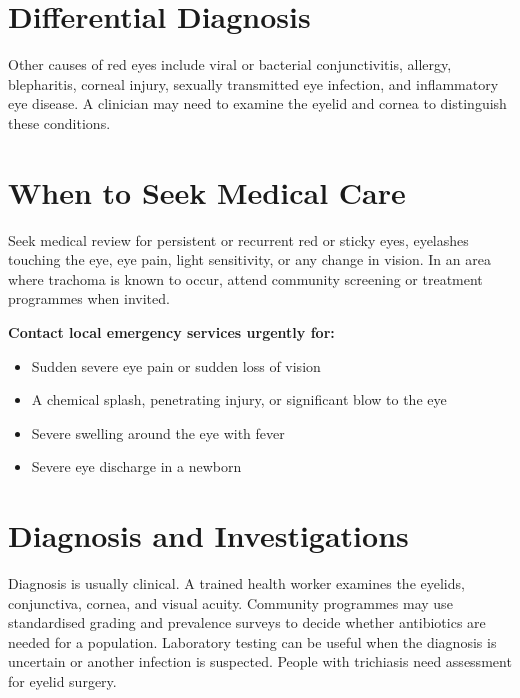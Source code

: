 \section*{Differential Diagnosis}
Other causes of red eyes include viral or bacterial conjunctivitis, allergy, blepharitis, corneal injury, sexually transmitted eye infection, and inflammatory eye disease. A clinician may need to examine the eyelid and cornea to distinguish these conditions.

\section*{When to Seek Medical Care}
Seek medical review for persistent or recurrent red or sticky eyes, eyelashes touching the eye, eye pain, light sensitivity, or any change in vision. In an area where trachoma is known to occur, attend community screening or treatment programmes when invited.

\textbf{Contact local emergency services urgently for:}
\begin{itemize}
    \item Sudden severe eye pain or sudden loss of vision
    \item A chemical splash, penetrating injury, or significant blow to the eye
    \item Severe swelling around the eye with fever
    \item Severe eye discharge in a newborn
\end{itemize}

\section*{Diagnosis and Investigations}
Diagnosis is usually clinical. A trained health worker examines the eyelids, conjunctiva, cornea, and visual acuity. Community programmes may use standardised grading and prevalence surveys to decide whether antibiotics are needed for a population. Laboratory testing can be useful when the diagnosis is uncertain or another infection is suspected. People with trichiasis need assessment for eyelid surgery.

